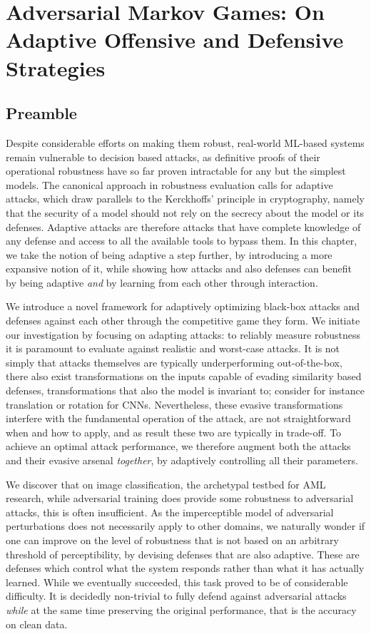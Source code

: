 \chapter{Adversarial Markov Games: On Adaptive Offensive and Defensive Strategies}\label{ch:markovgames}

\section*{Preamble}

Despite considerable efforts on making them robust, real-world ML-based systems remain vulnerable to decision based attacks, as definitive proofs of their operational robustness have so far proven intractable for any but the simplest models.
The canonical approach in robustness evaluation calls for adaptive attacks, which draw parallels to the Kerckhoffs' principle in cryptography, namely that the security of a model should not rely on the secrecy about the model or its defenses. 
Adaptive attacks are therefore attacks that have complete knowledge of any defense and access to all the available tools to bypass them.
In this chapter, we take the notion of being adaptive a step further, by introducing a more expansive notion of it, while showing how attacks and also defenses can benefit by being adaptive \emph{and} by learning from each other through interaction.

We introduce a novel framework for adaptively optimizing black-box attacks and defenses against each other through the competitive game they form.
We initiate our investigation by focusing on adapting attacks: to reliably measure robustness it is paramount to evaluate against realistic and worst-case attacks.
It is not simply that attacks themselves are typically underperforming out-of-the-box, there also exist transformations on the inputs capable of evading similarity based defenses, transformations that also the model is invariant to; consider for instance translation or rotation for \gls{CNN}s.
Nevertheless, these evasive transformations interfere with the fundamental operation of the attack, are not straightforward when and how to apply, and as result these two are typically in trade-off.
To achieve an optimal attack performance, we therefore augment both the attacks and their evasive arsenal \textit{together}, by adaptively controlling all their parameters.

We discover that on image classification, the archetypal testbed for \gls{AML} research, while adversarial training does provide some robustness to adversarial attacks, this is often insufficient.
As the imperceptible model of adversarial perturbations does not necessarily apply to other domains, we naturally wonder if one can improve on the level of robustness that is not based on an arbitrary threshold of perceptibility, by devising defenses that are also adaptive.
These are defenses which control what the system responds rather than what it has actually learned.
While we eventually succeeded, this task proved to be of considerable difficulty.
It is decidedly non-trivial to fully defend against adversarial attacks \textit{while} at the same time preserving the original performance, that is the accuracy on clean data.

